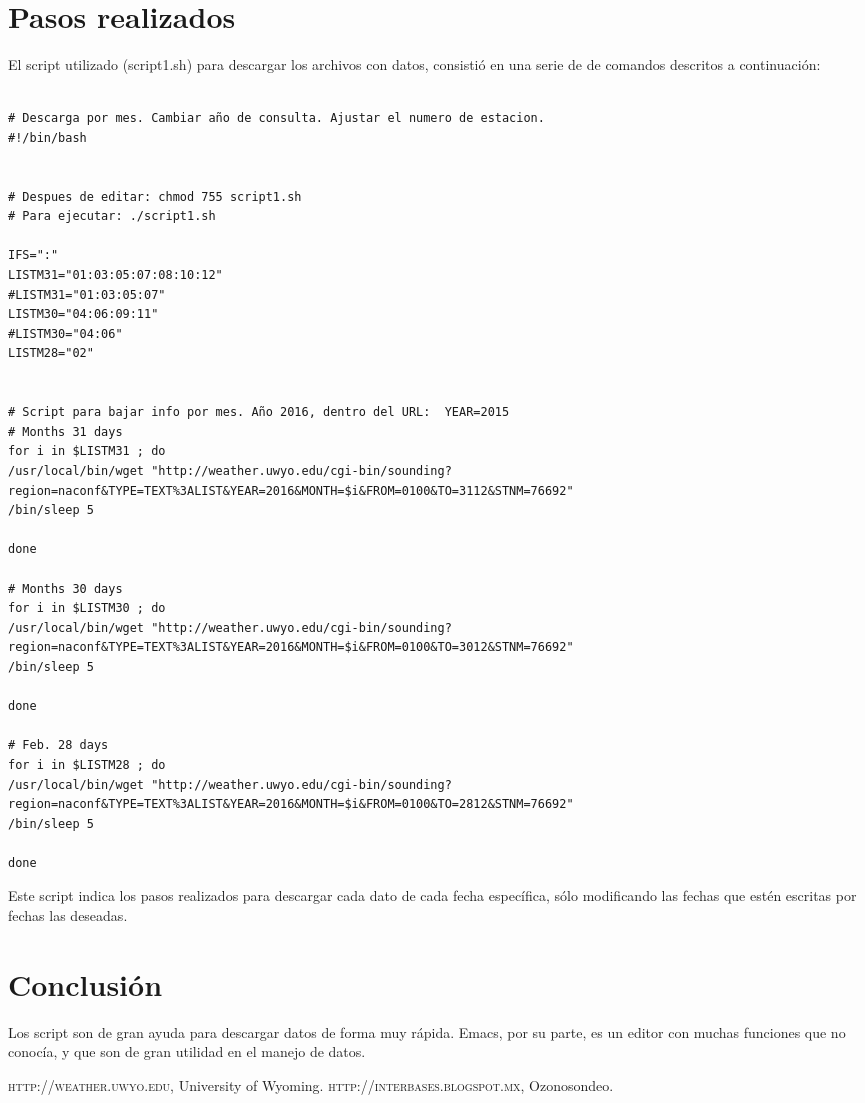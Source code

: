 \documentclass[a4paper]{article}
\begin{document}
\newpage
\section*{Pasos realizados}
El script utilizado (script1.sh) para descargar los archivos con datos, consistió en una serie de de comandos descritos a continuación:
\begin{verbatim}

# Descarga por mes. Cambiar año de consulta. Ajustar el numero de estacion.
#!/bin/bash

 
# Despues de editar: chmod 755 script1.sh
# Para ejecutar: ./script1.sh

IFS=":"
LISTM31="01:03:05:07:08:10:12"
#LISTM31="01:03:05:07"
LISTM30="04:06:09:11"
#LISTM30="04:06"
LISTM28="02"

 
# Script para bajar info por mes. Año 2016, dentro del URL:  YEAR=2015
# Months 31 days
for i in $LISTM31 ; do
/usr/local/bin/wget "http://weather.uwyo.edu/cgi-bin/sounding?region=naconf&TYPE=TEXT%3ALIST&YEAR=2016&MONTH=$i&FROM=0100&TO=3112&STNM=76692"
/bin/sleep 5

done

# Months 30 days
for i in $LISTM30 ; do
/usr/local/bin/wget "http://weather.uwyo.edu/cgi-bin/sounding?region=naconf&TYPE=TEXT%3ALIST&YEAR=2016&MONTH=$i&FROM=0100&TO=3012&STNM=76692"
/bin/sleep 5
       
done

# Feb. 28 days
for i in $LISTM28 ; do
/usr/local/bin/wget "http://weather.uwyo.edu/cgi-bin/sounding?region=naconf&TYPE=TEXT%3ALIST&YEAR=2016&MONTH=$i&FROM=0100&TO=2812&STNM=76692"
/bin/sleep 5
       
done

\end{verbatim}
Este script indica los pasos realizados para descargar cada dato de cada fecha específica, sólo modificando las fechas que estén escritas por fechas las deseadas.

\newpage 
\section*{Conclusión}
Los script son de gran ayuda para descargar datos de forma muy rápida. Emacs, por su parte, es un editor con muchas funciones que no conocía, y que son de gran utilidad en el manejo de datos. 

\begin{thebibliography}{5}
 \textsc{http://weather.uwyo.edu}, University of Wyoming.
 \textsc{http://interbases.blogspot.mx}, Ozonosondeo.
\end{thebibliography}
\end{document}
